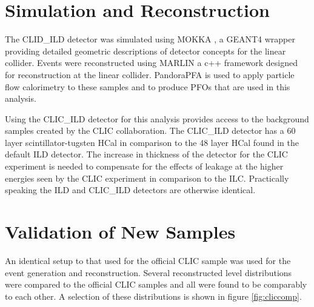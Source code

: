 \section{Simulation and Reconstruction}

The CLID\_ILD detector \cite{arXiv:1006.3396} was simulated using MOKKA \cite{MoradeFreitas:2002kj}, a GEANT4 \cite{Agostinelli:2002hh} wrapper providing detailed geometric descriptions of detector concepts for the linear collider.  Events were reconstructed using MARLIN \cite{Gaede:2006pj} a c++ framework designed for reconstruction at the linear collider.  PandoraPFA \cite{arXiv:0907.3577, arXiv:1209.4039} is used to apply particle flow calorimetry to these samples and to produce PFOs that are used in this analysis.  
 
Using the CLIC\_ILD detector for this analysis provides access to the background samples created by the CLIC collaboration. The CLIC\_ILD detector has a 60 layer scintillator-tugsten HCal in comparison to the 48 layer HCal found in the default ILD detector. The increase in thickness of the detector for the CLIC experiment is needed to compensate for the effects of leakage at the higher energies seen by the CLIC experiment in comparison to the ILC. Practically speaking the ILD and CLIC\_ILD detectors are otherwise identical.

\section{Validation of New Samples}

An identical setup to that used for the official CLIC sample was used for the event generation and reconstruction. Several reconstructed level distributions were compared to the official CLIC samples and all were found to be comparably to each other. A selection of these distributions is shown in figure \ref{fig:cliccomp}.

